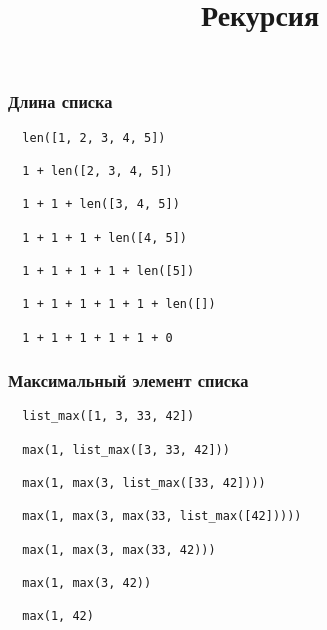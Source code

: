 \documentclass[10pt]{beamer}
\title{Рекурсия}
\begin{document}
\begin{frame}[fragile]
  \frametitle{Длина списка}
  \begin{lstlisting}
  len([1, 2, 3, 4, 5])

  1 + len([2, 3, 4, 5])

  1 + 1 + len([3, 4, 5])

  1 + 1 + 1 + len([4, 5])

  1 + 1 + 1 + 1 + len([5])

  1 + 1 + 1 + 1 + 1 + len([])

  1 + 1 + 1 + 1 + 1 + 0
  \end{lstlisting}
\end{frame}

\begin{frame}[fragile]
  \frametitle{Максимальный элемент списка}
  \begin{lstlisting}
  list_max([1, 3, 33, 42])

  max(1, list_max([3, 33, 42]))

  max(1, max(3, list_max([33, 42])))

  max(1, max(3, max(33, list_max([42]))))

  max(1, max(3, max(33, 42)))

  max(1, max(3, 42))

  max(1, 42)
  \end{lstlisting}
\end{frame}
\end{document}
